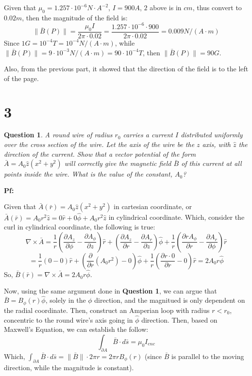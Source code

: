 \documentclass{article}
\newtheorem{question}{Question}
\begin{document}
Given that $\mu_0=1.257\cdot 10^{-6}N\cdot A^{-2}$, $I=900A$, $2$ above is in $cm$, thus convert to $0.02m$, then the magnitude of the field is:
$$\|\bar{B}(P)\|=\frac{\mu_0I}{2\pi\cdot 0.02} = \frac{1.257\cdot 10^{-6}\cdot 900}{2\pi \cdot 0.02} = 0.009 N/(A\cdot m)$$
Since $1G = 10^{-4}T = 10^{-4}N/(A\cdot m)$, while $\|\bar{B}(P)\| = 9\cdot 10^{-3} N/(A\cdot m)=90 \cdot 10^{-4}T$,
then $\|\bar{B}(P)\| = 90G$.

Also, from the previous part, it showed that the direction of the field is to the left of the page.

\break

\section*{3}
\begin{myBox}[]{}
    \begin{question}
        A round wire of radius $r_0$ carries a current $I$ distributed uniformly
        over the cross section of the wire. Let the axis of the wire be the $z$
        axis, with $\hat{z}$ the direction of the current. Show that a vector potential 
        of the form $\bar{A}=A_0\hat{z}(x^2+y^2)$ will correctly give the magnetic
        field $\bar{B}$ of this current at all points inside the wire. What is the value
        of the constant, $A_0$?
    \end{question}
\end{myBox}

\textbf{Pf:}

Given that $\bar{A}(\bar{r})=A_0\hat{z}(x^2+y^2)$ in cartesian coordinate, or $\bar{A}(\bar{r})=A_0r^2\hat{z} = 0\hat{r}+0\hat{\phi}+A_0r^2\hat{z}$ in cylindrical coordinate.
Which, consider the curl in cylindrical coordinate, the following is true:
$$\nabla\times \bar{A}=\frac{1}{r}\left(\frac{\partial A_z}{\partial \phi}-\frac{\partial A_\phi}{\partial z}\right)\hat{r}+\left(\frac{\partial A_z}{\partial r}-\frac{\partial A_r}{\partial z}\right)\hat{\phi}+\frac{1}{r}\left(\frac{\partial rA_\phi}{\partial r}-\frac{\partial A_r}{\partial \phi}\right)\hat{r}$$
$$=\frac{1}{r}\left(0-0\right)\hat{r}+\left(\frac{\partial}{\partial r}(A_0r^2)-0\right)\hat{\phi}+\frac{1}{r}\left(\frac{\partial r\cdot 0}{\partial r}-0\right)\hat{r} =2A_0r\hat{\phi}$$
So, $\bar{B}(\bar{r})=\nabla\times \bar{A}=2A_0r\hat{\phi}$.

\hfill

Now, using the same argument done in \textbf{Question 1}, we can argue that $\bar{B}=B_\phi(r)\hat{\phi}$, solely in the $\phi$ direction, and the magnitued is only dependent on the radial coordinate.
Then, construct an Amperian loop with radius $r<r_0$, concentric to the round wire's axis going in $\hat{\phi}$ direction. Then, based on Maxwell's Equation, we can establish the follow:
$$\int_{\partial A}\bar{B}\cdot d\bar{s}=\mu_0 I_{enc}$$
Which, $\int_{\partial A}\bar{B}\cdot d\bar{s}=\|\bar{B}\|\cdot 2\pi r = 2\pi rB_\phi(r)$ (since $\bar{B}$ is parallel to the moving direction, while the magnitude is constant).
\end{document}
